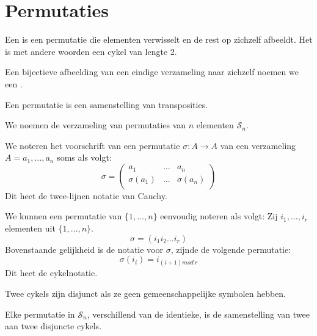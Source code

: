\documentclass[main.tex]{subfiles}
\begin{document}
\section{Permutaties}
\label{sec:permutaties}

\begin{de}
  Een  is een permutatie die elementen verwisselt en de rest op zichzelf afbeeldt.
  Het is met andere woorden een cykel van lengte 2.
\end{de}

\begin{de}
  Een bijectieve afbeelding van een eindige verzameling naar zichzelf noemen we een .
\end{de}

\begin{st}
  Een permutatie is een samenstelling van transposities.

\end{st}

\begin{de}
  We noemen de verzameling van permutaties van $n$ elementen $\mathcal{S}_{n}$.
\end{de}

\begin{de}
  We noteren het voorschrift van een permutatie $\sigma: A\rightarrow A$ van een verzameling $A = a_{1},\dotsc,a_{n}$ soms als volgt:
  \[
  \sigma = 
  \begin{pmatrix}
    a_{1}         & \hdots & a_{n}         \\
    \sigma(a_{1}) & \hdots & \sigma(a_{n}) \\
  \end{pmatrix}
  \]
  Dit heet de twee-lijnen notatie van Cauchy.
\end{de}

\begin{de}
  We kunnen een permutatie van $\{1,\dotsc,n\}$ eenvoudig noteren als volgt:
  Zij $i_{1},\dotsc,i_{r}$ elementen uit $\{1,\dotsc,n\}$.
  \[ \sigma = (i_{1}i_{2}\dotsc i_{r}) \]
  Bovenstaande gelijkheid is de notatie voor $\sigma$, zijnde de volgende permutatie:
  \[ \sigma(i_{i}) = i_{(i+1) mod\ r} \]
  Dit heet de cykelnotatie.
\end{de}

\begin{de}
  Twee cykels zijn disjunct als ze geen gemeenschappelijke symbolen hebben. 
\end{de}

\begin{st}
  Elke permutatie in $\mathcal{S}_{n}$, verschillend van de identieke, is de samenstelling van twee aan twee disjuncte cykels.

\end{st}
\end{document}
